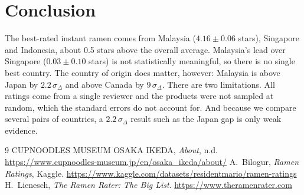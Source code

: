 \documentclass{article}
\begin{document}
\section*{Conclusion}
The best-rated instant ramen comes from Malaysia ($4.16\pm0.06$ stars),
Singapore and Indonesia, about 0.5 stars above the overall average.
Malaysia's lead over Singapore ($0.03\pm0.10$ stars) is not statistically
meaningful, so there is no single best country. The country of origin does
matter, however: Malaysia is above Japan by $2.2\,\sigma_\Delta$ and above
Canada by $9\,\sigma_\Delta$. There are two limitations. All ratings come
from a single reviewer and the products were not sampled at random, which
the standard errors do not account for. And because we compare several pairs
of countries, a $2.2\,\sigma_\Delta$ result such as the Japan gap is only
weak evidence.

{\small
\begin{thebibliography}{9}
 CUPNOODLES MUSEUM OSAKA IKEDA, \emph{About}, n.d.
  \url{https://www.cupnoodles-museum.jp/en/osaka_ikeda/about/}
 A.~Bilogur, \emph{Ramen Ratings}, Kaggle. \url{https://www.kaggle.com/datasets/residentmario/ramen-ratings}
 H.~Lienesch, \emph{The Ramen Rater: The Big List}.
  \url{https://www.theramenrater.com}
\end{thebibliography}}
\end{document}

